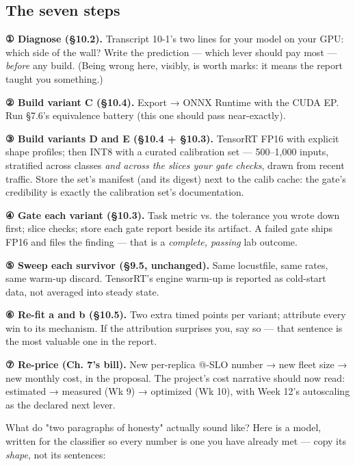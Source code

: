 \subsection*{The seven steps}

\begin{tbbitemize}
  \item \textbf{① Diagnose (§10.2).} Transcript 10-1's two lines for your model on your GPU: which side of the wall? Write the prediction — which lever should pay most — \textit{before} any build. (Being wrong here, visibly, is worth marks: it means the report taught you something.)
  \item \textbf{② Build variant C (§10.4).} Export → ONNX Runtime with the CUDA EP. Run §7.6's equivalence battery (this one should pass near-exactly).
  \item \textbf{③ Build variants D and E (§10.4 + §10.3).} TensorRT FP16 with explicit shape profiles; then INT8 with a curated calibration set — 500–1,000 inputs, stratified across classes \textit{and across the slices your gate checks}, drawn from recent traffic. Store the set's manifest (and its digest) next to the calib cache: the gate's credibility is exactly the calibration set's documentation.
  \item \textbf{④ Gate each variant (§10.3).} Task metric vs. the tolerance you wrote down first; slice checks; store each gate report beside its artifact. A failed gate ships FP16 and files the finding — that is a \textit{complete, passing} lab outcome.
  \item \textbf{⑤ Sweep each survivor (§9.5, unchanged).} Same locustfile, same rates, same warm-up discard. TensorRT's engine warm-up is reported as cold-start data, not averaged into steady state.
  \item \textbf{⑥ Re-fit a and b (§10.5).} Two extra timed points per variant; attribute every win to its mechanism. If the attribution surprises you, say so — that sentence is the most valuable one in the report.
  \item \textbf{⑦ Re-price (Ch. 7's bill).} New per-replica @-SLO number → new fleet size → new monthly cost, in the proposal. The project's cost narrative should now read: estimated → measured (Wk 9) → optimized (Wk 10), with Week 12's autoscaling as the declared next lever.
\end{tbbitemize}

What do "two paragraphs of honesty" actually sound like? Here is a model, written for the classifier so every number is one you have already met — copy its \textit{shape}, not its sentences:

